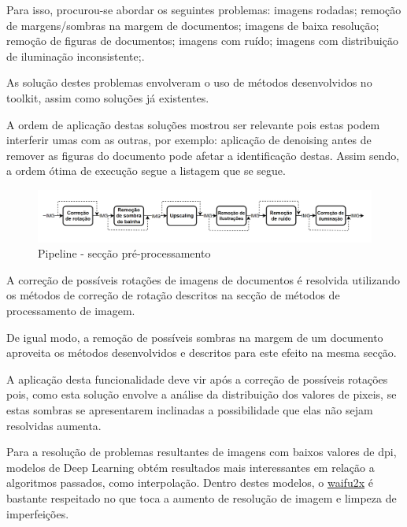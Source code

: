 Para isso, procurou-se abordar os seguintes problemas: imagens rodadas; remoção de margens/sombras na margem de documentos; imagens de baixa resolução; remoção de figuras de documentos; imagens com ruído; imagens com distribuição de iluminação inconsistente;.

As solução destes problemas envolveram o uso de métodos desenvolvidos no toolkit, assim como soluções já existentes.

A ordem de aplicação destas soluções mostrou ser relevante pois estas podem interferir umas com as outras, por exemplo: aplicação de denoising antes de remover as figuras do documento pode afetar a identificação destas. Assim sendo, a ordem ótima de execução segue a listagem que se segue.

\begin{figure}[H]
	\centering
	\includegraphics[width=1\textwidth]{images/diagramas/arquitetura_pipeline_preprocess.png}
	\caption{Pipeline - secção pré-processamento}
	\label{fig:arquitetura_pipeline_preprocess}
\end{figure}


A correção de possíveis rotações de imagens de documentos é resolvida utilizando os métodos de correção de rotação descritos na secção de métodos de processamento de imagem.


De igual modo, a remoção de possíveis sombras na margem de um documento aproveita os métodos desenvolvidos e descritos para este efeito na mesma secção. 

A aplicação desta funcionalidade deve vir após a correção de possíveis rotações pois, como esta solução envolve a análise da distribuição dos valores de pixeis, se estas sombras se apresentarem inclinadas a possibilidade que elas não sejam resolvidas aumenta.



Para a resolução de problemas resultantes de imagens com baixos valores de dpi, modelos de Deep Learning obtém resultados mais interessantes em relação a algoritmos passados, como interpolação. Dentro destes modelos, o \href{https://github.com/nagadomi/waifu2x}{waifu2x} é bastante respeitado no que toca a aumento de resolução de imagem e limpeza de imperfeições. 

